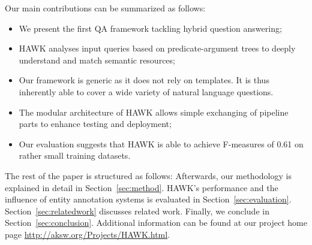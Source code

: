 \documentclass{llncs}
\begin{document}
Our main contributions can be summarized as follows:
 \begin{itemize}
 \item We present the first QA framework tackling hybrid question answering;
 \item HAWK analyses input queries based on predicate-argument trees to deeply understand and match semantic resources;
 \item Our framework is generic as it does not rely on templates. It is thus inherently able to cover a wide variety of natural language questions. %
 \item The modular architecture of HAWK allows simple exchanging of pipeline parts to enhance testing and deployment;
 \item Our evaluation suggests that HAWK is able to achieve F-measures of 0.61 on rather small training datasets.
 \end{itemize}

The rest of the paper is structured as follows:
Afterwards, our methodology is explained in detail in Section~\ref{sec:method}.
HAWK's performance and the influence of entity annotation systems is evaluated in Section~\ref{sec:evaluation}. 
Section~\ref{sec:relatedwork} discusses related work.  
Finally, we conclude in Section~\ref{sec:conclusion}. Additional information can be found at our project home page \url{http://aksw.org/Projects/HAWK.html}.

%






\end{document}
